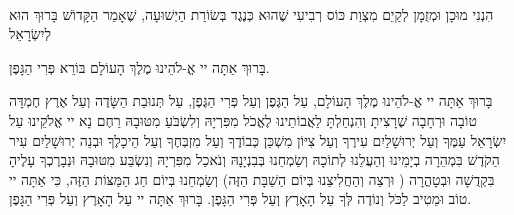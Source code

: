 \ \\

הִנְנִי מוּכָן וּמְזֻמָן לְקַיֵם מִצְוַת כּוֹס רְבִיעִי שֶׁהוּא כְּנֶגֶד בְּשׂוֹרַת הַיְשׁוּעָה, שֶׁאָמַר הַקָּדוֹשׁ בָּרוּךְ הוּא לְיִשְׂרָאֵל 

בָּרוּךְ אַתָּה יי אֱ-לֹהֵינוּ מֶלֶךְ הָעוֹלָם בּוֹרֵא פְּרִי הַגָּפֶן.



בָּרוּךְ אַתָּה יי אֱ-לֹהֵינוּ מֶלֶךְ הָעוֹלָם, עַל הַגֶּפֶן וְעַל פְּרִי הַגֶּפֶן, עַל תְּנוּבַת הַשָּׂדֶה וְעַל אֶרֶץ חֶמְדָּה טוֹבָה וּרְחָבָה שֶׁרָצִיתָ וְהִנְחַלְתָּ לַאֲבוֹתֵינוּ לֶאֱכֹל מִפִּרְיָהּ וְלִשְׂבֹּעַ מִטּוּבָהּ רַחֶם נָא יי אֱלֹקֵינוּ עַל יִשְׂרָאֵל עַמֶּךָ וְעַל יְרוּשָׁלַיִם עִירֶךָ וְעַל צִיּוֹן מִשְׁכַּן כְּבוֹדֶךָ וְעַל מִזְבְּחֶךָ וְעַל הֵיכָלֶךָ וּבְנֵה יְרוּשָׁלַיִם עִיר הַקֹדֶשׁ בִּמְהֵרָה בְיָמֵינוּ וְהַעֲלֵנוּ לְתוֹכָהּ וְשַׂמְחֵנוּ בְּבִנְיָנָהּ וְנֹאכַל מִפִּרְיָהּ וְנִשְׂבַּע מִטּוּבָהּ וּנְבָרֶכְךָ עָלֶיהָ בִּקְדֻשָׁה 
וּבְטָהֳרָה ( וּרְצֵה וְהַחֲלִיצֵנוּ בְּיוֹם הַשַׁבָּת הַזֶּה) וְשַׂמְחֵנוּ בְּיוֹם חַג הַמַּצּוֹת הַזֶּה, כִּי אַתָּה יי טוֹב וּמֵטִיב לַכֹּל וְנוֹדֶה לְּךָ עַל הָאָרֶץ וְעַל פְּרִי הַגָּפֶן. בָּרוּךְ אַתָּה יי עַל הָאָרֶץ וְעַל פְּרִי הַגָּפֶן.

\break


\setlength{\parindent}{0em}

